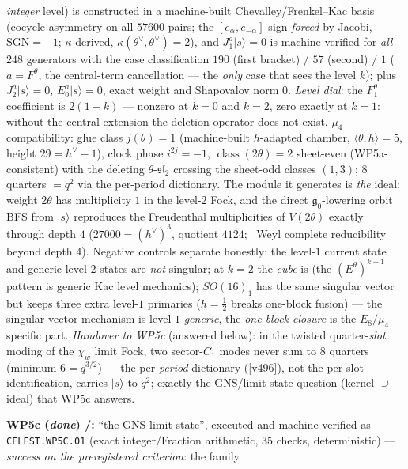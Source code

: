 \emph{integer} level) is constructed in a machine-built Chevalley/Frenkel--Kac basis (cocycle asymmetry
on all $57600$ pairs; the $[e_\alpha,e_{-\alpha}]$ sign \emph{forced} by Jacobi, $\mathrm{SGN}=-1$;
$\kappa$ derived, $\kappa(\theta^\vee,\theta^\vee)=2$), and $J^a_1|s\rangle=0$ is machine-verified for
\emph{all} $248$ generators with the case classification $190$ (first bracket) $/$ $57$ (second) $/$
$1$ ($a=F^\theta$, the central-term cancellation --- the \emph{only} case that sees the level $k$);
plus $J^a_2|s\rangle=0$, $E^a_0|s\rangle=0$, exact weight and Shapovalov norm $0$.
\emph{Level dial}: the $F^\theta_1$ coefficient is $2(1{-}k)$ --- nonzero at $k{=}0$ and $k{=}2$, zero
exactly at $k{=}1$: without the central extension the deletion operator does not exist.
$\mu_4$ compatibility: glue class $j(\theta)=1$ (machine-built $h$-adapted chamber,
$\langle\theta,h\rangle=5$, height $29=h^\vee{-}1$), clock phase $i^{2j}=-1$,
$\operatorname{class}(2\theta)=2$ sheet-even (WP5a-consistent) with the deleting
$\theta$-$\mathfrak{sl}_2$ crossing the sheet-odd classes $(1,3)$; $8$ quarters $=q^2$ via the
per-period dictionary. The module it generates is \emph{the} ideal: weight $2\theta$ has multiplicity
$1$ in the level-$2$ Fock, and the direct $\mathfrak g_0$-lowering orbit BFS from $|s\rangle$
reproduces the Freudenthal multiplicities of $V(2\theta)$ exactly through depth $4$
($27000=(h^\vee)^3$, quotient $4124$; \mC\ Weyl complete reducibility beyond depth $4$). Negative
controls separate honestly: the level-$1$ current state and generic level-$2$ states are \emph{not}
singular; at $k{=}2$ the \emph{cube} is (the $(E^\theta)^{k+1}$ pattern is generic Kac level
mechanics); $SO(16)_1$ has the same singular vector but keeps three extra level-$1$ primaries
($h=\tfrac12$ breaks one-block fusion) --- the singular-vector mechanism is level-$1$ \emph{generic},
the \emph{one-block closure} is the $E_8/\mu_4$-specific part. \emph{Handover to WP5c} (answered
below): in the twisted quarter-\emph{slot} moding of the $\chi_w$ limit Fock, two sector-$C_1$ modes
never sum to $8$ quarters (minimum $6=q^{3/2}$) --- the per-\emph{period} dictionary (\vref{v496}),
not the per-slot identification, carries $|s\rangle$ to $q^2$; exactly the GNS/limit-state question
(kernel $\supseteq$ ideal) that WP5c answers.
\item \textbf{WP5c (\emph{done}) \mE/\mC:} ``the GNS limit state'', executed and machine-verified as
\texttt{CELEST.WP5C.01}  (exact integer/Fraction
arithmetic, $35$ checks, deterministic) --- \emph{success on the preregistered criterion}: the family
